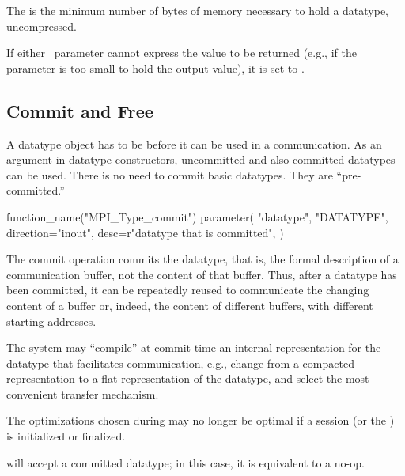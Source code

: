 The  is the minimum number of bytes of
memory necessary to hold a datatype, uncompressed.

If either \OUT\ parameter cannot express the value to
be returned (e.g., if the parameter is too small to hold the output
value), it is set to .

\subsection{Commit and Free}
\label{subsec:pt2pt-comfree}

A datatype object has to be  before it can be used in a
communication.
As an argument in datatype constructors, uncommitted and also
committed datatypes can be used.
There is no need to commit basic datatypes. They are ``pre-committed.''

\begin{mpi-binding}
    function_name("MPI_Type_commit")
    parameter(
        "datatype",
        "DATATYPE",
        direction="inout",
        desc=r"datatype that is committed",
    )
\end{mpi-binding}

The commit operation commits the datatype, that is, the formal description of
a communication buffer, not the content of that buffer.  Thus, after a datatype
has been committed, it can be repeatedly reused to communicate the changing
content
of a buffer or, indeed, the content of different buffers, with different
starting addresses.

\begin{implementors}
The system may ``compile'' at commit time an internal
representation for the datatype that facilitates
communication, e.g.,
change from a compacted representation to a flat representation of the
datatype, and select the most convenient transfer mechanism.

The optimizations chosen during  may no longer be optimal
if a session (or the \wpm{}) is initialized or finalized.
\end{implementors}

will accept a committed datatype;
in this case, it is equivalent to a no-op.


